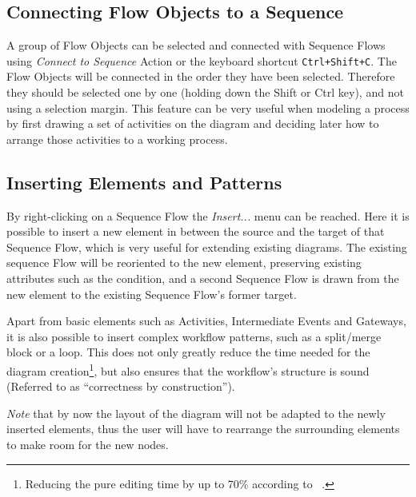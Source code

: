 
\subsection{Connecting Flow Objects to a Sequence}
A group of Flow Objects can be selected and connected with Sequence Flows using
\emph{Connect to Sequence} Action or the keyboard shortcut \texttt{Ctrl+Shift+C}.
The Flow Objects will be connected in the order they have been selected.  Therefore
they should be selected one by one (holding down the Shift or Ctrl key), and not
using a selection margin.  This feature can be very useful when modeling a process
by first drawing a set of activities on the diagram and deciding later how to
arrange those activities to a working process.



\subsection{Inserting Elements and Patterns}

By right-clicking on a Sequence Flow the \emph{Insert...} menu can be reached.
Here it is possible to insert a new element in between the source and the target
of that Sequence Flow, which is very useful for extending existing diagrams.  The
existing sequence Flow will be reoriented to the new element, preserving existing
attributes such as the condition, and a second Sequence Flow is drawn from the
new element to the existing Sequence Flow's former target.

Apart from basic elements such as Activities, Intermediate Events and Gateways,
it is also possible to insert complex workflow patterns, such as a split/merge
block or a loop.  This does not only greatly reduce the time needed for the
diagram creation\footnote{Reducing the pure editing time by up to 70\% according
to ~\cite{gschwind2008applying}.}, but also ensures that the workflow's structure
is sound (Referred to as ``correctness by construction'').

\emph{Note} that by now the layout of the diagram will not be adapted to the newly
inserted elements, thus the user will have to rearrange the surrounding elements
to make room for the new nodes.




